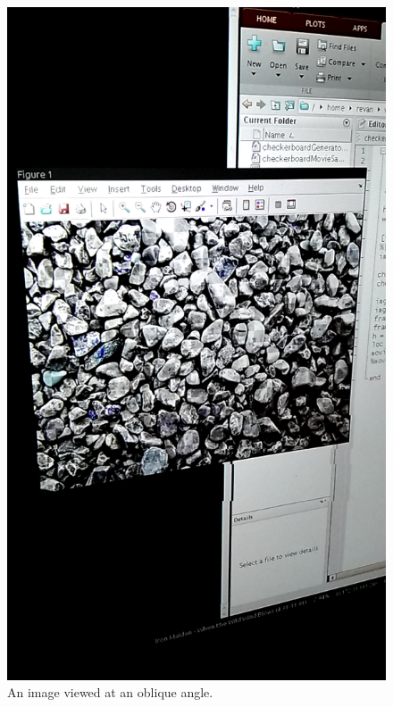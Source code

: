 \documentclass[11pt, letterpaper]{article}
\begin{document}
\begin{figure}[hbtp]
\centering
\includegraphics[scale=0.10]{img/skew.png}
\caption{An image viewed at an oblique angle.}
\label{fig:skew}
\end{figure}
\end{document}
